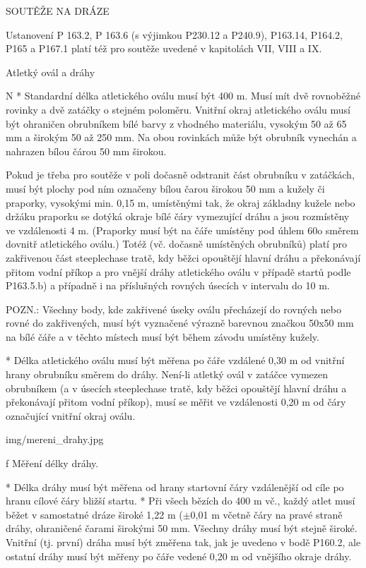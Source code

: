 \sec SOUTĚŽE NA DRÁZE

Ustanovení P 163.2, P 163.6 (s výjimkou P230.12 a P240.9), P163.14, P164.2, P165 a P167.1 platí též pro soutěže uvedené v kapitolách VII, VIII a IX.

\secc Atletký ovál a dráhy

\begitems \style N
* Standardní délka atletického oválu musí být 400 m. Musí mít dvě rovnoběžné rovinky a dvě zatáčky o stejném poloměru. Vnitřní okraj atletického oválu musí být ohraničen obrubníkem bílé barvy z vhodného materiálu, vysokým 50 až 65 mm a širokým 50 až 250 mm. Na obou rovinkách může být obrubník vynechán a nahrazen bílou čárou 50 mm širokou.

Pokud je třeba pro soutěže v poli dočasně odstranit část obrubníku v zatáčkách, musí být plochy pod ním označeny bílou čarou širokou 50 mm a kužely či praporky, vysokými min. 0,15 m, umístěnými tak, že okraj základny kužele nebo držáku praporku se dotýká okraje bílé čáry vymezující dráhu a jsou rozmístěny ve vzdálenosti 4 m. (Praporky musí být na čáře umístěny pod úhlem 60o směrem dovnitř atletického oválu.) Totéž (vč. dočasně umístěných obrubníků) platí pro zakřivenou část steeplechase tratě, kdy běžci opouštějí hlavní dráhu a překonávají přitom vodní příkop a pro vnější dráhy atletického oválu v případě startů podle P163.5.b) a případně i na příslušných rovných úsecích v intervalu do 10 m.

POZN.: Všechny body, kde zakřivené úseky oválu přecházejí do rovných nebo rovné do zakřivených, musí být vyznačené výrazně barevnou značkou 50x50 mm na bílé čáře a v těchto místech musí být během závodu umístěny kužely.

* Délka atletického oválu musí být měřena po čáře vzdálené 0,30 m od vnitřní hrany obrubníku směrem do dráhy. Není-li atletký ovál v zatáčce vymezen obrubníkem (a v úsecích steeplechase tratě, kdy běžci opouštějí hlavní dráhu a překonávají přitom vodní příkop), musí se měřit ve vzdálenosti 0,20 m od čáry označující vnitřní okraj oválu.

\picw=7cm \inspic img/mereni_drahy.jpg
\caption/f Měření délky dráhy.

* Délka dráhy musí být měřena od hrany startovní čáry vzdálenější od cíle po hranu cílové čáry bližší startu.
* Při všech bězích do 400 m vč., každý atlet musí běžet v samostatné dráze široké 1,22 m ($\pm$0,01 m včetně čáry na pravé straně dráhy, ohraničené čarami širokými 50 mm. Všechny dráhy musí být stejně široké. Vnitřní (tj. první) dráha musí být změřena tak, jak je uvedeno v bodě P160.2, ale ostatní dráhy musí být měřeny po čáře vedené 0,20 m od vnějšího okraje dráhy.

